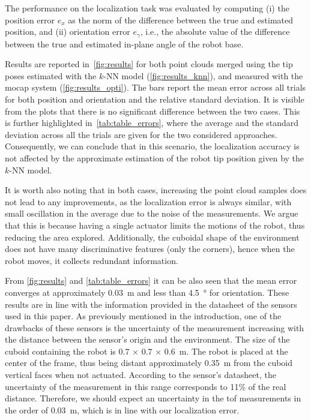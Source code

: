 The performance on the localization task was evaluated by computing (i) the position error $e_x$ as the norm of the difference between the true and estimated position, and (ii) orientation error $e_{\gamma}$, i.e., the absolute value of the difference between the true and estimated in-plane angle of the robot base. 

Results are reported in~\cref{fig:results} for both point clouds merged using the tip poses estimated with the $k$-NN model (\cref{fig:results_knn}), and measured with the \gls{mocap} system (\cref{fig:results_opti}). 
The bars report the mean error across all trials for both position and orientation and the relative standard deviation.
It is visible from the plots that there is no significant difference between the two cases. This is further highlighted in~\cref{tab:table_errors}, where the average and the standard deviation across all the trials are given for the two considered approaches. Consequently, we can conclude that in this scenario, the localization accuracy is not affected by the approximate estimation of the robot tip position given by the $k$-NN model.

It is worth also noting that in both cases, increasing the point cloud samples does not lead to any improvements, as the localization error is always similar, with small oscillation in the average due to the noise of the measurements. We argue that this is because having a single actuator limits the motions of the robot, thus reducing the area explored. Additionally, the cuboidal shape of the environment does not have many discriminative features (only the corners), hence when the robot moves, it collects redundant information.

%

From \cref{fig:results} and \cref{tab:table_errors} it can be also seen that the mean error converges at approximately \SI{0.03}{\meter} and less than \SI{4.5}{\degree} for orientation. 
These results are in line with the information provided in the datasheet of the sensors used in this paper\cite{st_vl53l5cx_datasheet}. As previously mentioned in the introduction, one of the drawbacks of these sensors is the uncertainty of the measurement increasing with the distance between the sensor's origin and the environment. The size of the cuboid containing the robot is $0.7$ $\times$ $0.7$ $\times$ \SI{0.6}{\meter}. The robot is placed at the center of the frame, thus being distant approximately \SI{0.35}{\meter} from the cuboid vertical faces when not actuated. According to the sensor's datasheet, the uncertainty of the measurement in this range corresponds to 11\% of the real distance. %
Therefore, we should expect an uncertainty in the \gls{tof} measurements in the order of \SI{0.03}{\meter}, which is in line with our localization error.
% 

